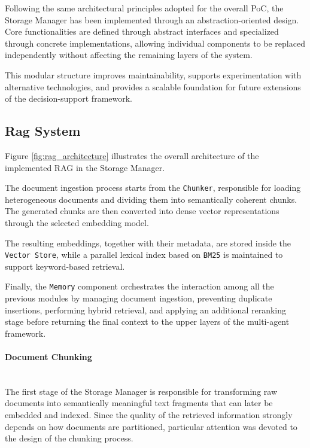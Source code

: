 Following the same architectural principles adopted for the overall PoC, the Storage Manager has been implemented through an abstraction-oriented design. Core functionalities are defined through abstract interfaces and specialized through concrete implementations, allowing individual components to be replaced independently without affecting the remaining layers of the system.

This modular structure improves maintainability, supports experimentation with alternative technologies, and provides a scalable foundation for future extensions of the decision-support framework.

\subsection{Rag System}

Figure \ref{fig:rag_architecture} illustrates the overall architecture of the implemented RAG in the Storage Manager.

The document ingestion process starts from the \texttt{Chunker}, responsible for loading heterogeneous documents and dividing them into semantically coherent chunks. The generated chunks are then converted into dense vector representations through the selected embedding model.

The resulting embeddings, together with their metadata, are stored inside the \texttt{Vector Store}, while a parallel lexical index based on \texttt{BM25} is maintained to support keyword-based retrieval.

Finally, the \texttt{Memory} component orchestrates the interaction among all the previous modules by managing document ingestion, preventing duplicate insertions, performing hybrid retrieval, and applying an additional reranking stage before returning the final context to the upper layers of the multi-agent framework.

\paragraph{Document Chunking}~\\

The first stage of the Storage Manager is responsible for transforming raw documents into semantically meaningful text fragments that can later be embedded and indexed. Since the quality of the retrieved information strongly depends on how documents are partitioned, particular attention was devoted to the design of the chunking process.

